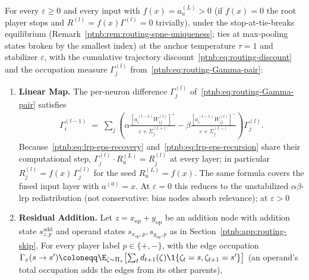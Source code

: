 \begin{theoremenv}\label{ptnb:thm:ab-recovery}
For every $\varepsilon \ge 0$ and every input with $f(x)=a_u^{(L)}>0$ (if $f(x)=0$ the root player
stops and $R^{(l)}=f(x)\Gamma^{(l)}=0$ trivially), under the stop-at-tie-breaks equilibrium
(Remark~\ref{ptnb:rem:routing-spne-uniqueness}; ties at max-pooling states broken by the smallest index)
at the anchor temperature $\tau = 1$ and stabilizer $\varepsilon$, with the cumulative trajectory
discount~\eqref{ptnb:eq:routing-discount} and the occupation measure $\Gamma_j^{(l)}$
from~\eqref{ptnb:eq:routing-Gamma-pair}:
\begin{enumerate}
    \item \textbf{Linear Map.} The per-neuron difference $\Gamma^{(l)}_j$ of~\eqref{ptnb:eq:routing-Gamma-pair}
        satisfies
        \begin{align}\label{ptnb:eq:lrp-eps-recovery}
            \Gamma^{(l-1)}_i
            \;=\; \sum_j \left(
            \alpha \frac{[a_i^{(l-1)} W_{ij}^{(l)}]^+}{\varepsilon + \Sigma_j^{(l,+)}}
            -
            \beta \frac{[a_i^{(l-1)} W_{ij}^{(l)}]^-}{\varepsilon + \Sigma_j^{(l,-)}}
            \right) \Gamma^{(l)}_j.
        \end{align}
        Because~\eqref{ptnb:eq:lrp-eps-recovery} and~\eqref{ptnb:eq:lrp-eps-recursion} share their computational
        step, $\Gamma^{(l)}_j \cdot R_u^{(L)} = R^{(l)}_j$ at every layer; in particular $R^{(l)}_j =
            f(x)\,\Gamma^{(l)}_j$ for the seed $R^{(L)}_u = f(x)$. The same formula covers the fused input
        layer with $a^{(0)} = x$. At $\varepsilon = 0$ this reduces to the unstabilized
        $\alpha\beta$-\ac{lrp} redistribution (not conservative: bias nodes absorb relevance); at
        $\varepsilon > 0$ 
    \item \textbf{Residual Addition.} Let $z = x_{\mathrm{op}} + y_{\mathrm{op}}$ be an addition node with
        addition state $s^{\mathrm{add}}_{z,p}$ and operand states $s_{x_{\mathrm{op}},p},
            s_{y_{\mathrm{op}},p}$ as in Section~\ref{ptnb:app:routing-skip}. For every player label $p\in\{+,-\}$,
        with the edge occupation $\Gamma_x(s\to s')\coloneqq\E_{\zeta\sim\Pi_x}\bigl[\sum_t
            d_{t+1}(\zeta)\1\{\zeta_t=s,\zeta_{t+1}=s'\}\bigr]$ (an operand's total occupation adds the edges
        from its other parents),

\end{enumerate}
\end{theoremenv}
